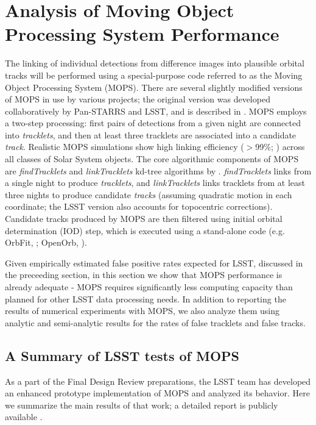 
\section{Analysis of Moving Object Processing System Performance \label{sec:mops}}


The linking of individual detections from difference images into plausible orbital tracks will be performed using
a special-purpose code referred to as the Moving Object Processing System (MOPS). There are several slightly modified
versions of MOPS in use by various projects; the original version was developed collaboratively by Pan-STARRS
and LSST, and is described in \cite{denneau13}. MOPS employs a two-step processing: first pairs of detections
from a given night are connected into {\it tracklets}, and then at least three tracklets are associated into a
candidate {\it track}. Realistic MOPS simulations show high linking efficiency ($>$99\%; \citealt{denneau13})
across all classes of Solar System objects. The core algorithmic components of MOPS are {\it findTracklets} and
{\it linkTracklets} kd-tree algorithms by \citet{kubica07}. {\it findTracklets} links \DIASources from a single
night to produce {\it tracklets}, and {\it linkTracklets} links tracklets from at least three nights to produce candidate
{\it tracks} (assuming quadratic motion in each coordinate; the LSST version also accounts for topocentric
corrections). Candidate tracks produced by MOPS are then filtered using initial orbital determination (IOD) step,
which is executed using a stand-alone code (e.g. OrbFit, \citealt{milani08}; OpenOrb, \citealt{OpenOrb2009}).

Given empirically estimated false positive rates expected for LSST, discussed in the preceeding section,
in this section we show that MOPS performance is already adequate - MOPS requires significantly less
computing capacity than planned for other LSST data processing needs. In addition to reporting the results of
numerical experiments with MOPS, we also analyze them using analytic and semi-analytic results for the
rates of false tracklets and false tracks.




\subsection{A Summary of LSST tests of MOPS}

As a part of the Final Design Review preparations, the LSST team has developed an enhanced prototype
implementation of MOPS and analyzed its behavior. Here we summarize the main results of that work;
a detailed report is publicly available \citep{LDM-156}.

